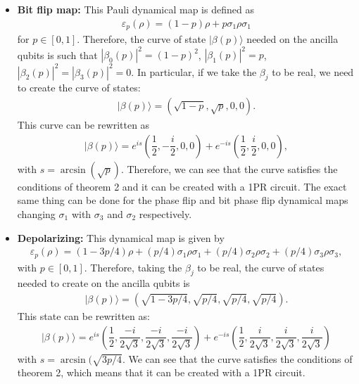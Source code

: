 \documentclass[10pt,letterpaper]{article} %
\begin{document}
\begin{itemize}
\item \textbf{Bit flip map:} 
This Pauli dynamical map is defined as
\begin{align*}
\varepsilon_p(\rho) = (1-p)\rho + p\sigma_1 \rho \sigma_1
\end{align*}
for $p \in [0,1]$. 
Therefore, the curve of state $|\beta(p)\rangle$ needed on the ancilla
qubits is such that 
$|\beta_0(p)|^2= (1-p)^2$, $|\beta_1(p)|^2 = p$, $|\beta_2(p)|^2 = |\beta_3(p)|^2 = 0$.
In particular, if we take the $\beta_j$ to be real,
we need to create the curve of states:
\begin{align*}
|\beta(p)\rangle = (\sqrt{1-p},\sqrt{p},0,0).
\end{align*}
This curve can be rewritten as
\begin{align*}
|\beta(p) \rangle = e^{is} \left( \dfrac{1}{2}, - \dfrac{i}{2},0,0 \right) + e^{-is} \left( \dfrac{1}{2}, \dfrac{i}{2},0,0 \right),
\end{align*}
with $s= \arcsin(\sqrt{p})$.
Therefore, we can see that the curve satisfies the conditions of theorem 2 
and it can be created with a 1PR circuit.
The exact same thing can be done
for the phase flip and bit phase flip dynamical maps
changing $\sigma_1$ with
$\sigma_3$ and $\sigma_2$ respectively.

\item \textbf{Depolarizing:} This dynamical map is given by
\begin{align*}
\varepsilon_p(\rho) = (1-3p/4) \rho + (p/4) \sigma_1 \rho \sigma_1 + (p/4) \sigma_2 \rho \sigma_2 + (p/4) \sigma_3 \rho \sigma_3,
\end{align*}
with $p \in [0,1]$. 
Therefore, taking the $\beta_j$ to be real,
the curve of states needed to create on the ancilla qubits is
\begin{align*}
|\beta(p) \rangle = \left( \sqrt{1-3p/4}, \sqrt{p/4}, \sqrt{p/4},\sqrt{p/4} \right).
\end{align*}
This state can be rewritten as:
\begin{align*}
|\beta(p)\rangle = e^{is} \left( \dfrac{1}{2}, \dfrac{-i}{2\sqrt{3}},\dfrac{-i}{2\sqrt{3}},\dfrac{-i}{2\sqrt{3}} \right) + e^{-is} \left( \dfrac{1}{2}, \dfrac{i}{2\sqrt{3}},\dfrac{i}{2\sqrt{3}},\dfrac{i}{2\sqrt{3}}\right)
\end{align*}
with $s = \arcsin(\sqrt{3p/4}$.
We can see that the curve satisfies the conditions of theorem 2, which
means that it can be created with a 
1PR circuit.


\end{itemize}
\end{document}

